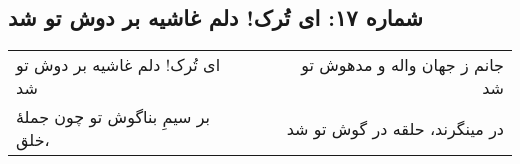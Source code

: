 \begin{center}
\section*{شماره ۱۷: ای تُرک! دلم غاشیه بر دوش تو شد}
\label{sec:017}
\begin{longtable}{l p{0.5cm} r}
ای تُرک! دلم غاشیه بر دوش تو شد
&&
جانم ز جهان واله و مدهوش تو شد
\\
بر سیمِ بناگوش تو چون جملهٔ خلق،
&&
در مینگرند، حلقه در گوش تو شد
\\
\end{longtable}
\end{center}
